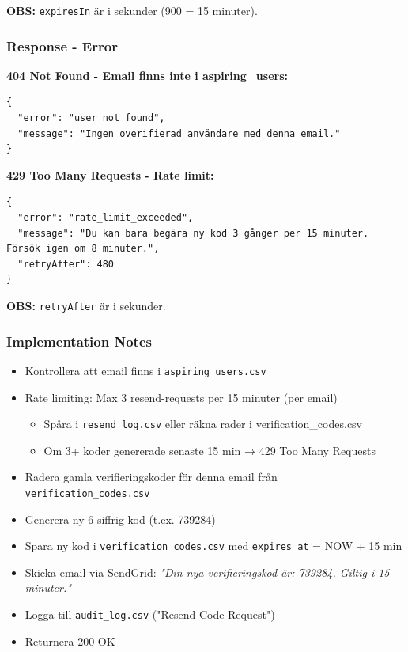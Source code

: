\documentclass[12pt,a4paper]{article}
\begin{document}
\textbf{OBS:} \texttt{expiresIn} är i sekunder (900 = 15 minuter).

\subsubsection{Response - Error}

\textbf{404 Not Found - Email finns inte i aspiring\_users:}
\begin{lstlisting}
{
  "error": "user_not_found",
  "message": "Ingen overifierad användare med denna email."
}
\end{lstlisting}

\textbf{429 Too Many Requests - Rate limit:}
\begin{lstlisting}
{
  "error": "rate_limit_exceeded",
  "message": "Du kan bara begära ny kod 3 gånger per 15 minuter. Försök igen om 8 minuter.",
  "retryAfter": 480
}
\end{lstlisting}

\textbf{OBS:} \texttt{retryAfter} är i sekunder.

\subsubsection{Implementation Notes}
\begin{itemize}[noitemsep]
  \item Kontrollera att email finns i \texttt{aspiring\_users.csv}
  \item Rate limiting: Max 3 resend-requests per 15 minuter (per email)
  \begin{itemize}[noitemsep]
    \item Spåra i \texttt{resend\_log.csv} eller räkna rader i verification\_codes.csv
    \item Om 3+ koder genererade senaste 15 min → 429 Too Many Requests
  \end{itemize}
  \item Radera gamla verifieringskoder för denna email från \texttt{verification\_codes.csv}
  \item Generera ny 6-siffrig kod (t.ex. 739284)
  \item Spara ny kod i \texttt{verification\_codes.csv} med \texttt{expires\_at} = NOW + 15 min
  \item Skicka email via SendGrid: \textit{"Din nya verifieringskod är: 739284. Giltig i 15 minuter."}
  \item Logga till \texttt{audit\_log.csv} ("Resend Code Request")
  \item Returnera 200 OK
\end{itemize}
\end{document}
